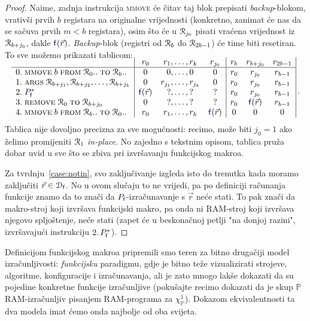 \begin{proof}
Naime, zadnja instrukcija \textsc{mmove} će čitav taj blok prepisati \emph{backup}-blokom, vrativši prvih $b$ registara na originalne vrijednosti (konkretno, zanimat će nas da se sačuva prvih $m<b$ registara), osim što će u $\mathcal R_{j_0}$ pisati vraćena vrijednost iz $\mathcal R_{b+j_0}$, dakle $\f f(\vec r)$. \emph{Backup}-blok (registri od $\mathcal R_{b}$ do $\mathcal R_{2b-1}$) će time biti resetiran. To sve možemo prikazati tablicom:
\begin{equation}\label{eq:funmakrotab}
    \begin{array}{r@{\;}l|cr@{,\dotsc,\,}lc|ccc|}
\SwapAboveDisplaySkip
      &                                                             & r_0          & r_1     & r_k     & r_{j_0}      & r_b & r_{b+j_0}    & r_{2b-1}\\\hline
0.&\textsc{mmove}\;b\;\textsc{from}\;\reg0..\;\textsc{to}\;\reg{b}..& 0            & 0       & 0       & 0            & r_0 & r_{j_0}      & r_{b-1} \\
1.&\textsc{args}\;\reg{b+j_1},\reg{b+j_2},\dotsc,\reg{b+j_k}        & 0            & r_{j_1} & r_{j_k} & 0            & r_0 & r_{j_0}      & r_{b-1} \\
2.&P_{\f{f}}^*                                                        & \f{f}(\vec r) & ?       & ?       & ?            & r_0 & r_{j_0}      & r_{b-1} \\
3.&\remove{0}{b+j_0}                                                & 0            & ?       & ?       & ?            & r_0 & \f f(\vec r) & r_{b-1}\\
4.&\textsc{mmove}\;b\;\textsc{from}\;\reg{b}..\;\textsc{to}\;\reg0..& r_0          & r_1     & r_k     & \f f(\vec r) & 0   & 0            & 0
    \end{array}\,\text.
\end{equation}
Tablica nije dovoljno precizna za sve mogućnosti: recimo, može biti $j_0=1$ ako želimo promijeniti $\mathcal R_{1}$ \emph{in-place}. No zajedno s tekstnim opisom, tablica pruža dobar uvid u sve što se zbiva pri izvršavanju funkcijskog makroa.

Za tvrdnju~\ref{case:notin}, svo zaključivanje izgleda isto do trenutka kada moramo zaključiti $\vec r\in\dom{\f{f}}$. No u ovom slučaju to ne vrijedi, pa po definiciji računanja funkcije znamo da to znači da $P_{\f{f}}$-izračunavanje s $\vec r$ neće stati. To pak znači da makro-stroj koji izvršava funkcijski makro, pa onda ni RAM-stroj koji izvršava njegovo spljoštenje, neće stati (zapet će u beskonačnoj petlji "na donjoj razini", izvršavajući instrukciju $2.\,P_{\f f}^*$).
\end{proof}

Definicijom funkcijskog makroa pripremili smo teren za bitno drugačiji model iz\-ra\-čun\-lji\-vo\-sti: \emph{funkcijsku} paradigmu, gdje je bitno teže vizualizirati strojeve, algoritme, konfiguracije i izračunavanja, ali je zato mnogo lakše dokazati da su pojedine konkretne funkcije izračunljive (pokušajte recimo dokazati da je skup $\mathbb P$ RAM-izračunljiv pisanjem RAM-programa za $\chi_{\mathbb P}^1$). Dokazom ekvivalentnosti ta dva modela imat ćemo onda najbolje od oba svijeta.
